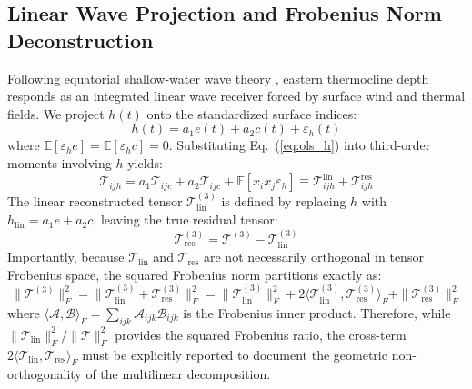\documentclass[11pt,a4paper]{article}
\begin{document}
\subsection{Linear Wave Projection and Frobenius Norm Deconstruction}
Following equatorial shallow-water wave theory \citep{jin1997paradigm, meinen2000observations}, eastern thermocline depth responds as an integrated linear wave receiver forced by surface wind and thermal fields. We project $h(t)$ onto the standardized surface indices:
\begin{equation}
h(t) = a_1 e(t) + a_2 c(t) + \varepsilon_h(t)
\label{eq:ols_h}
\end{equation}
where $\mathbb{E}[\varepsilon_h e] = \mathbb{E}[\varepsilon_h c] = 0$. Substituting Eq.~(\ref{eq:ols_h}) into third-order moments involving $h$ yields:
\begin{equation}
\mathcal{T}_{ijh} = a_1 \mathcal{T}_{ije} + a_2 \mathcal{T}_{ijc} + \mathbb{E}[x_i x_j \varepsilon_h] \equiv \mathcal{T}_{ijh}^{\text{lin}} + \mathcal{T}_{ijh}^{\text{res}}
\end{equation}
The linear reconstructed tensor $\mathcal{T}_{\text{lin}}^{(3)}$ is defined by replacing $h$ with $h_{\text{lin}} = a_1 e + a_2 c$, leaving the true residual tensor:
\begin{equation}
\mathcal{T}_{\text{res}}^{(3)} = \mathcal{T}^{(3)} - \mathcal{T}_{\text{lin}}^{(3)}
\end{equation}
Importantly, because $\mathcal{T}_{\text{lin}}$ and $\mathcal{T}_{\text{res}}$ are not necessarily orthogonal in tensor Frobenius space, the squared Frobenius norm partitions exactly as:
\begin{equation}
\|\mathcal{T}^{(3)}\|_F^2 = \|\mathcal{T}_{\text{lin}}^{(3)} + \mathcal{T}_{\text{res}}^{(3)}\|_F^2 = \|\mathcal{T}_{\text{lin}}^{(3)}\|_F^2 + 2\langle \mathcal{T}_{\text{lin}}^{(3)}, \mathcal{T}_{\text{res}}^{(3)} \rangle_F + \|\mathcal{T}_{\text{res}}^{(3)}\|_F^2
\label{eq:frobenius_balance}
\end{equation}
where $\langle \mathcal{A}, \mathcal{B} \rangle_F = \sum_{ijk} \mathcal{A}_{ijk} \mathcal{B}_{ijk}$ is the Frobenius inner product. Therefore, while $\|\mathcal{T}_{\text{lin}}\|_F^2 / \|\mathcal{T}\|_F^2$ provides the squared Frobenius ratio, the cross-term $2\langle \mathcal{T}_{\text{lin}}, \mathcal{T}_{\text{res}} \rangle_F$ must be explicitly reported to document the geometric non-orthogonality of the multilinear decomposition.
\end{document}
